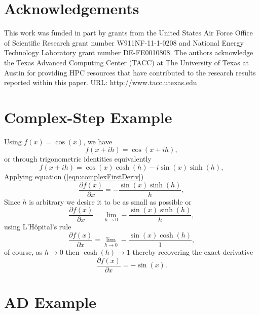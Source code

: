 \documentclass[preprint,12pt]{elsarticle}
\begin{document}
\section{Acknowledgements}
\label{sec:ack}
This work was funded in part by grants from the United States Air Force Office of Scientific Research grant number W911NF-11-1-0208 and National Energy Technology Laboratory grant number DE-FE0010808. The authors acknowledge the Texas Advanced Computing Center (TACC) at The University of Texas at Austin for providing HPC resources that have contributed to the research results reported within this paper. URL: http://www.tacc.utexas.edu





\appendix
\renewcommand*{\thesection}{\Alph{section}}
%
\section{Complex-Step Example}
\label{sec:appendixA}
%
Using $f(x) = \cos(x)$, we have
%
\[
f (x + i h) = \cos(x + i h),
\]
%
or through trigonometric identities equivalently
%
\[
f(x + i h) = \cos(x) \cosh(h) - i \sin(x) \sinh(h),
\]
%
Applying equation (\ref{eqn:complexFirstDeriv})
\[
\frac{\partial f(x)}{\partial x} = - \frac{\sin(x) \sinh(h)}{h},
\]
Since $h$ is arbitrary we desire it to be as small as possible or
\[
\frac{\partial f(x)}{\partial x} = \lim_{h \to 0} - \frac{\sin(x) \sinh(h)}{h},
\]
using L'H\^opital's rule
\[
\frac{\partial f(x)}{\partial x} = \lim_{h \to 0} - \frac{\sin(x) \cosh(h)}{1},
\]
of course, as $h \to 0$ then $\cosh(h) \to 1$ thereby recovering the exact derivative
\[
\frac{\partial f(x)}{\partial x} =-\sin(x).
\]

\section{AD Example}
\label{sec:appendixB}
\end{document}
